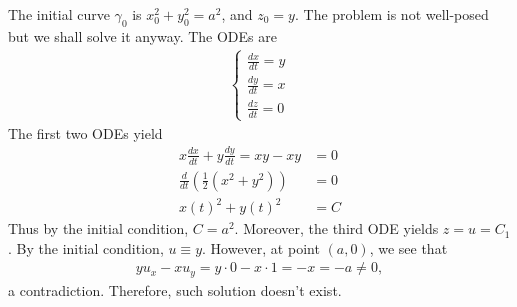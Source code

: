 \documentclass[12pt]{article}
\begin{document}
\begin{problem}[5]
The initial curve $ \gamma_0$ is $ x_0^2+y_0^2=a^2$, and $ z_0=y$. The problem is not well-posed but we shall solve it anyway. The ODEs are
\begin{align*}
\begin{cases}
	\frac{d x}{d t} =y\\
	\frac{d y}{d t} =x\\
	\frac{d z}{d t} =0
\end{cases}
\end{align*}
The first two ODEs yield
\begin{align*}
	x \frac{d x}{d t} + y \frac{d y}{d t} = xy - xy &= 0 \\
	\frac{d}{dt} \left( \frac{1}{2} \left( x^2+y^2 \right)  \right) &= 0 \\
	x(t)^2+y(t)^2 &= C 
\end{align*}
Thus by the initial condition, $ C = a^2$. Moreover, the third ODE yields $ z = u = C_1$. By the initial condition, $ u \equiv y$. However, at point $ (a,0)$, we see that
 \begin{align*}
	y u_x - xu_y = y \cdot 0 - x \cdot 1 = -x = -a \neq 0,
\end{align*}
a contradiction. Therefore, such solution doesn't exist.
\end{problem}
\end{document}
